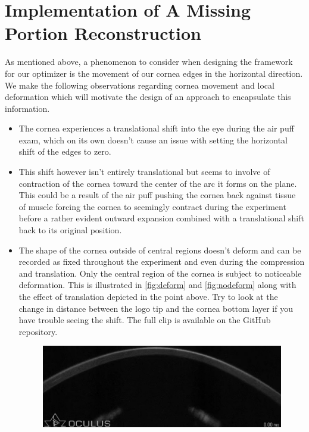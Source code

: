 \documentclass[epjST]{svjour}
\begin{document}
\section{Implementation of A Missing Portion Reconstruction}
\label{vec}
As mentioned above, a phenomenon to consider when designing the framework for our optimizer is the movement of our cornea edges in the horizontal direction. We make the following observations regarding cornea movement and local deformation which will motivate the design of an approach to encapsulate this information.
\begin{itemize}
    \item The cornea experiences a translational shift into the eye during the air puff exam, which on its own doesn't cause an issue with setting the horizontal shift of the edges to zero.
    \\\item This shift however isn't entirely translational but seems to involve of contraction of the cornea toward the center of the arc it forms on the plane. This could be a result of the air puff pushing the cornea back against tissue of muscle forcing the cornea to seemingly contract during the experiment before a rather evident outward expansion combined with a translational shift back to its original position.
    \\\item The shape of the cornea outside of central regions doesn't deform and can be recorded as fixed throughout the experiment and even during the compression and translation. Only the central region of the cornea is subject to noticeable deformation. This is illustrated in \autoref{fig:deform} and \autoref{fig:nodeform} along with the effect of translation depicted in the point above. Try to look at the change in distance between the logo tip and the cornea bottom layer if you have trouble seeing the shift. The full clip is available on the GitHub repository.
    \begin{figure}[h]
        \centering
        \includegraphics[width=1\linewidth]{figures/Compression/nodeform.png}

\end{figure}
\end{itemize}
\end{document}
